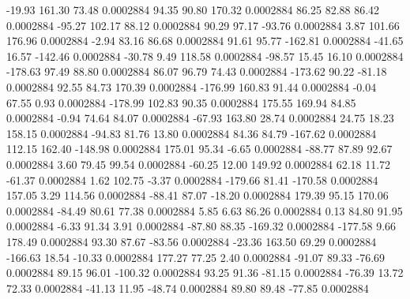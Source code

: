       -19.93      161.30       73.48     0.0002884
       94.35       90.80      170.32     0.0002884
       86.25       82.88       86.42     0.0002884
      -95.27      102.17       88.12     0.0002884
       90.29       97.17      -93.76     0.0002884
        3.87      101.66      176.96     0.0002884
       -2.94       83.16       86.68     0.0002884
       91.61       95.77     -162.81     0.0002884
      -41.65       16.57     -142.46     0.0002884
      -30.78        9.49      118.58     0.0002884
      -98.57       15.45       16.10     0.0002884
     -178.63       97.49       88.80     0.0002884
       86.07       96.79       74.43     0.0002884
     -173.62       90.22      -81.18     0.0002884
       92.55       84.73      170.39     0.0002884
     -176.99      160.83       91.44     0.0002884
       -0.04       67.55        0.93     0.0002884
     -178.99      102.83       90.35     0.0002884
      175.55      169.94       84.85     0.0002884
       -0.94       74.64       84.07     0.0002884
      -67.93      163.80       28.74     0.0002884
       24.75       18.23      158.15     0.0002884
      -94.83       81.76       13.80     0.0002884
       84.36       84.79     -167.62     0.0002884
      112.15      162.40     -148.98     0.0002884
      175.01       95.34       -6.65     0.0002884
      -88.77       87.89       92.67     0.0002884
        3.60       79.45       99.54     0.0002884
      -60.25       12.00      149.92     0.0002884
       62.18       11.72      -61.37     0.0002884
        1.62      102.75       -3.37     0.0002884
     -179.66       81.41     -170.58     0.0002884
      157.05        3.29      114.56     0.0002884
      -88.41       87.07      -18.20     0.0002884
      179.39       95.15      170.06     0.0002884
      -84.49       80.61       77.38     0.0002884
        5.85        6.63       86.26     0.0002884
        0.13       84.80       91.95     0.0002884
       -6.33       91.34        3.91     0.0002884
      -87.80       88.35     -169.32     0.0002884
     -177.58        9.66      178.49     0.0002884
       93.30       87.67      -83.56     0.0002884
      -23.36      163.50       69.29     0.0002884
     -166.63       18.54      -10.33     0.0002884
      177.27       77.25        2.40     0.0002884
      -91.07       89.33      -76.69     0.0002884
       89.15       96.01     -100.32     0.0002884
       93.25       91.36      -81.15     0.0002884
      -76.39       13.72       72.33     0.0002884
      -41.13       11.95      -48.74     0.0002884
       89.80       89.48      -77.85     0.0002884

